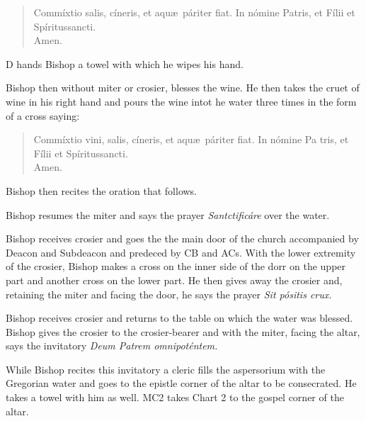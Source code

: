 \documentclass[letterpaper]{report}
\begin{document}
{\begin{quote}
    Commíxtio salis, cíneris, et aqu\ae\ páriter fiat. In nómine Pa\cross tris,
    et Fí\cross lii et Spíritus\cross sancti. \\
   \rbar Amen.
\end{quote}

D hands Bishop a towel with which he wipes his hand.

\rubric Bishop then without miter or crosier, blesses the wine. He then takes the
cruet of wine in his right hand and pours the wine intot he water three times
in the form of a cross saying:

\begin{quote}
    Commíxtio vini, salis, cíneris, et aqu\ae\ páriter fiat. In nómine Pa\cross
    tris, et Fí\cross lii et Spíritus\cross sancti. \\
   \rbar Amen.
\end{quote}

Bishop then recites the oration that follows.

\rubric Bishop resumes the miter and says the prayer \textit{Santcti\cross ficáre}
over the water.

\rubric Bishop receives crosier and goes the the main door of the church accompanied
by Deacon and Subdeacon and predeced by CB and ACs. With the lower extremity of the
crosier, Bishop makes a cross on the inner side of the dorr on the upper part and
another cross on the lower part. He then gives away the crosier and, retaining
the miter and facing the door, he says the prayer \textit{Sit pósitis crux.}

\rubric Bishop receives crosier and returns to the table on which the water was
blessed. Bishop gives the crosier to the crosier-bearer and with the miter, facing
the altar, says the invitatory \textit{Deum Patrem omnipoténtem.}

While Bishop recites this invitatory a cleric fills the aspersorium with the
Gregorian water and goes to the epistle corner of the altar to be consecrated.
He takes a towel with him as well. MC2 takes Chart 2 to the gospel corner of
the altar.

}
\end{document}
